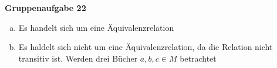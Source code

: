 \documentclass[11pt, a4paper]{article}
\newcommand{\aufgabe}[1]{{\center\large\bfseries Gruppenaufgabe #1 \\}}
\begin{document}
\aufgabe{22}
\begin{enumerate}[a)]
	\item Es handelt sich um eine Äquivalenzrelation
	\item Es haldelt sich nicht um eine Äquivalenzrelation, da die Relation nicht transitiv ist. Werden drei Bücher $a, b, c \in M$ betrachtet
\end{enumerate}
\end{document}

